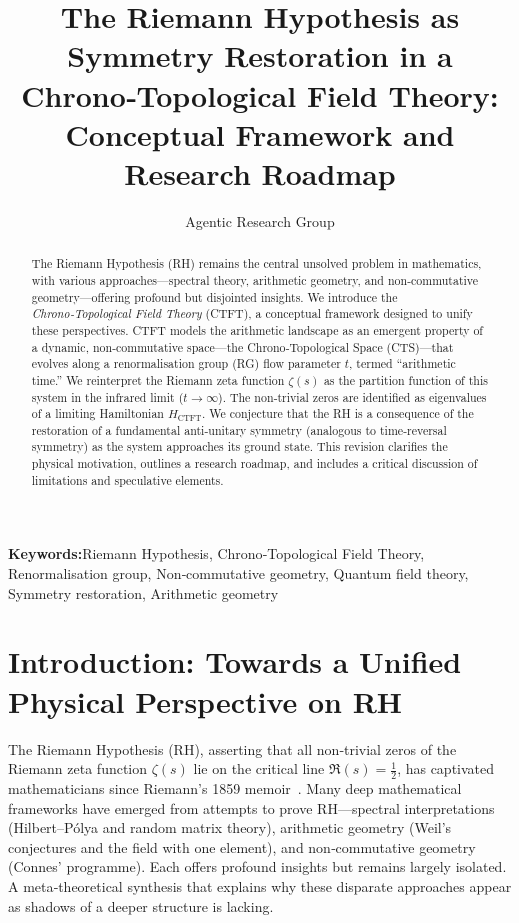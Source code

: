 \documentclass[11pt, a4paper]{article}
\title{The Riemann Hypothesis as Symmetry Restoration in a Chrono‑Topological Field Theory:\\Conceptual Framework and Research Roadmap}
\author{Agentic Research Group}
\date{}
\theoremstyle{definition}
\newcommand{\keywords}[1]{\par\addvspace\baselineskip\noindent\textbf{Keywords:}\enspace\ignorespaces#1}
\begin{document}
\maketitle

\begin{abstract}
The Riemann Hypothesis (RH) remains the central unsolved problem in mathematics, with various approaches—spectral theory, arithmetic geometry, and non‑commutative geometry—offering profound but disjointed insights.  We introduce the \emph{Chrono‑Topological Field Theory} (CTFT), a conceptual framework designed to unify these perspectives.  CTFT models the arithmetic landscape as an emergent property of a dynamic, non‑commutative space—the Chrono‑Topological Space (CTS)—that evolves along a renormalisation group (RG) flow parameter $t$, termed “arithmetic time.”  We reinterpret the Riemann zeta function $\zeta(s)$ as the partition function of this system in the infrared limit ($t\to\infty$).  The non‑trivial zeros are identified as eigenvalues of a limiting Hamiltonian $H_{\mathrm{CTFT}}$.  We conjecture that the RH is a consequence of the restoration of a fundamental anti‑unitary symmetry (analogous to time‑reversal symmetry) as the system approaches its ground state.  This revision clarifies the physical motivation, outlines a research roadmap, and includes a critical discussion of limitations and speculative elements.
\end{abstract}

\keywords{Riemann Hypothesis, Chrono‑Topological Field Theory, Renormalisation group, Non‑commutative geometry, Quantum field theory, Symmetry restoration, Arithmetic geometry}

\tableofcontents

\section{Introduction: Towards a Unified Physical Perspective on RH}

The Riemann Hypothesis (RH), asserting that all non‑trivial zeros of the Riemann zeta function $\zeta(s)$ lie on the critical line $\Re(s)=\tfrac12$, has captivated mathematicians since Riemann’s 1859 memoir \cite{Riemann1859}.  Many deep mathematical frameworks have emerged from attempts to prove RH—spectral interpretations (Hilbert–Pólya and random matrix theory), arithmetic geometry (Weil’s conjectures and the field with one element), and non‑commutative geometry (Connes’ programme).  Each offers profound insights but remains largely isolated.  A meta‑theoretical synthesis that explains why these disparate approaches appear as shadows of a deeper structure is lacking.
\end{document}
